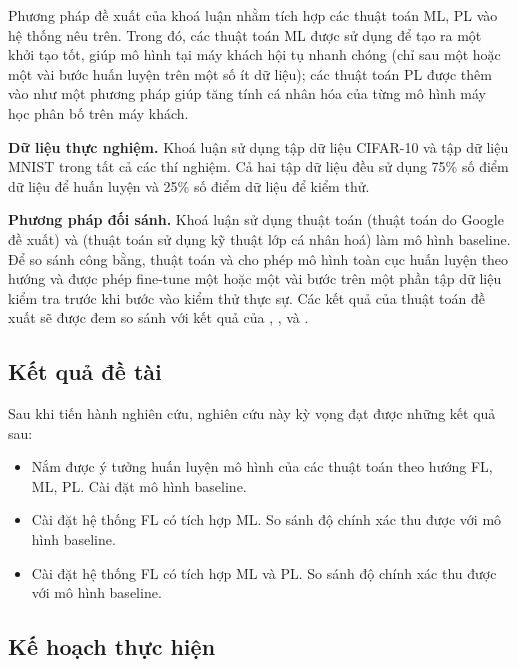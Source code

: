 Phương pháp đề xuất của khoá luận nhằm tích hợp các thuật toán ML, PL vào hệ thống nêu trên. Trong đó, các thuật toán ML được sử dụng để tạo ra một khởi tạo tốt, giúp mô hình tại máy khách hội tụ nhanh chóng (chỉ sau một hoặc một vài bước huấn luyện trên một số ít dữ liệu); các thuật toán PL được thêm vào như một phương pháp giúp tăng tính cá nhân hóa của từng mô hình máy học phân bố trên máy khách.

\textbf{Dữ liệu thực nghiệm.} Khoá luận sử dụng tập dữ liệu CIFAR-10 và tập dữ liệu MNIST trong tất cả các thí nghiệm. Cả hai tập dữ liệu đều sử dụng 75\% số điểm dữ liệu để huấn luyện và 25\% số điểm dữ liệu để kiểm thử.

\textbf{Phương pháp đối sánh.} Khoá luận sử dụng thuật toán  \cite{mcmahan2017communication} (thuật toán do Google đề xuất) và  \cite{arivazhagan2019federated} (thuật toán sử dụng kỹ thuật lớp cá nhân hoá) làm mô hình baseline. Để so sánh công bằng, thuật toán  và  cho phép mô hình toàn cục huấn luyện theo hướng  và  được phép fine-tune một hoặc một vài bước trên một phần tập dữ liệu kiểm tra trước khi bước vào kiểm thử thực sự. Các kết quả của thuật toán đề xuất sẽ được đem so sánh với kết quả của , ,  và .

\subsection*{Kết quả đề tài}

Sau khi tiến hành nghiên cứu, nghiên cứu này kỳ vọng đạt được những kết quả sau:

\begin{itemize}
    \item Nắm được ý tưởng huấn luyện mô hình của các thuật toán theo hướng FL, ML, PL. Cài đặt mô hình baseline.
    \item Cài đặt hệ thống FL có tích hợp ML. So sánh độ chính xác thu được với mô hình baseline.
    \item Cài đặt hệ thống FL có tích hợp ML và PL. So sánh độ chính xác thu được với mô hình baseline.
\end{itemize}

\subsection*{Kế hoạch thực hiện}


